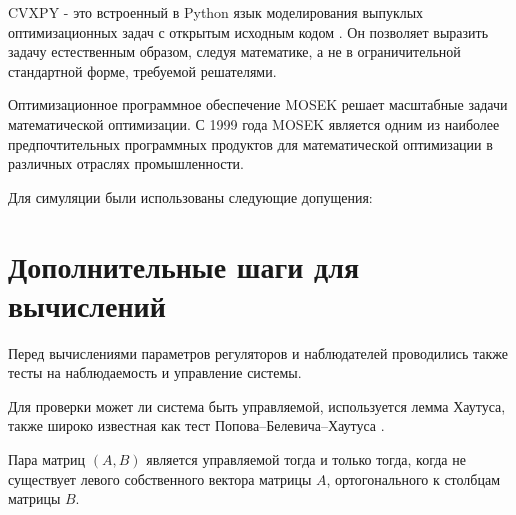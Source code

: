 \begin{comment}
		{Q}_1{N}_1\T \\0
	\end{bmatrix}\T \\ \leq  \frac{1}{\epsilon_3}\begin{bmatrix}
		{Q}_1{N}_1\T \\0
	\end{bmatrix}\begin{bmatrix}
		{Q}_1{N}_1\T \\ 0
	\end{bmatrix}\T +\epsilon_3 \begin{bmatrix}
		0 \\ {P}_2{S}{M}_1
	\end{bmatrix}\begin{bmatrix}
		0 \\ {P}_2{S}{M}_1
	\end{bmatrix}\T.
\end{multline}
%
Подставляя \eqref{eq:thm1_term_1},\eqref{eq:thm1_term_2} и \eqref{eq:thm1_term_3} в \eqref{eq:Young_expand} получаем выражение \eqref{eq:thm1_LMI_after_Young}.

\clearpage
\refstepcounter{chapter}

\end{comment}


CVXPY - это встроенный в Python язык моделирования выпуклых оптимизационных задач с открытым исходным кодом \cite{cvxpy}. Он позволяет выразить задачу естественным образом, следуя математике, а не в ограничительной стандартной форме, требуемой решателями.

Оптимизационное программное обеспечение MOSEK \cite{mosek} решает масштабные задачи математической оптимизации. С 1999 года MOSEK является одним из наиболее предпочтительных программных продуктов для математической оптимизации в различных отраслях промышленности. 

Для симуляции были использованы следующие допущения: 

\chapter{Дополнительные шаги для вычислений}\label{app:B}

Перед вычислениями параметров регуляторов и наблюдателей проводились также тесты на наблюдаемость и управление системы. 

Для проверки может ли система быть управляемой, используется лемма Хаутуса, также широко известная как тест Попова--Белевича--Хаутуса \cite{bernstein2018scalar}.
\begin{lemma}
	Пара матриц $(A, B)$ является управляемой тогда и только тогда, когда не существует левого собственного вектора матрицы $A$, ортогонального к столбцам матрицы $B$.
\end{lemma}

